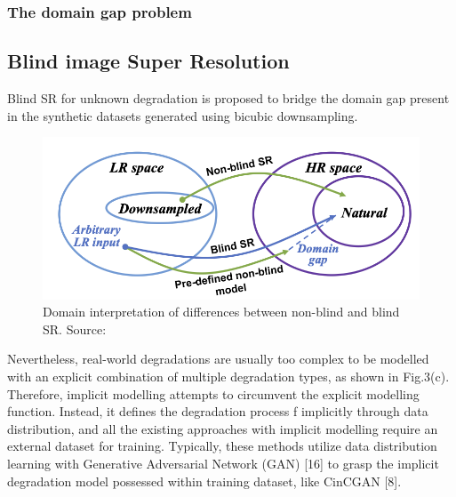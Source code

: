         
        \subsubsection{The domain gap problem}

    \subsection{Blind image Super Resolution}
    
        Blind SR for unknown degradation is proposed to bridge the domain gap present in the synthetic datasets generated using bicubic downsampling.
    

        \begin{figure}[h!]
            \centering
            \includegraphics[scale=0.45]{Includes/2-DomainGap.png}
            \caption{Domain interpretation of differences between non-blind and blind SR. Source: \cite{liu2021blind}}
            \label{fig:2-DomainGap}
        \end{figure}

        Nevertheless, real-world degradations are usually too complex to be modelled with an explicit combination of multiple degradation types, as shown in Fig.3(c). Therefore, implicit modelling attempts to circumvent the explicit modelling function. Instead, it defines the degradation process f implicitly through data distribution, and all the existing approaches with implicit modelling require an external dataset for training. Typically, these methods utilize data distribution learning with Generative Adversarial Network (GAN) [16] to grasp the implicit degradation model possessed within training dataset, like CinCGAN [8].

\clearpage